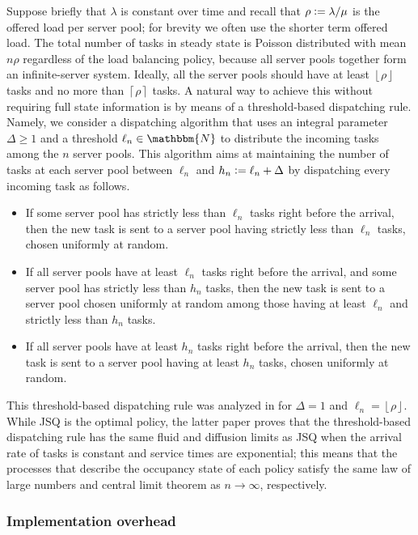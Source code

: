 \documentclass[a4paper, 12pt]{article}
\theoremstyle{definition}
\newcommand{\floor}[1]{\left\lfloor#1\right\rfloor}
\newcommand{\ceil}[1]{\left\lceil#1\right\rceil}
\newcommand{\defeq}{\vcentcolon=}
\newcommand{\N}{\mathbbm{N}}
\begin{document}
Suppose briefly that $\lambda$ is constant over time and recall that $\rho \defeq \lambda / \mu$ is the offered load per server pool; for brevity we often use the shorter term offered load. The total number of tasks in steady state is Poisson distributed with mean $n\rho$ regardless of the load balancing policy, because all server pools together form an infinite-server system. Ideally, all the server pools should have at least $\floor{\rho}$ tasks and no more than $\ceil{\rho}$ tasks. A natural way to achieve this without requiring full state information is by means of a threshold-based dispatching rule. Namely, we consider a dispatching algorithm that uses an integral parameter $\Delta \geq 1$ and a threshold $\ell_n \in \N$ to distribute the incoming tasks among the $n$ server pools. This algorithm aims at maintaining the number of tasks at each server pool between $\ell_n$ and $h_n \defeq \ell_n + \Delta$ by dispatching every incoming task as follows.
\begin{itemize}
	\item If some server pool has strictly less than $\ell_n$ tasks right before the arrival, then the new task is sent to a server pool having strictly less than $\ell_n$ tasks, chosen uniformly at random.
	
	\item If all server pools have at least $\ell_n$ tasks right before the arrival, and some server pool has strictly less than $h_n$ tasks, then the new task is sent to a server pool chosen uniformly at random among those having at least $\ell_n$ and strictly less than $h_n$ tasks.
	
	\item If all server pools have at least $h_n$ tasks right before the arrival, then the new task is sent to a server pool having at least $h_n$ tasks, chosen uniformly at random.
\end{itemize}

This threshold-based dispatching rule was analyzed in \cite{goldsztajn2021self} for $\Delta = 1$ and $\ell_n = \floor{\rho}$. While JSQ is the optimal policy, the latter paper proves that the threshold-based dispatching rule has the same fluid and diffusion limits as JSQ when the arrival rate of tasks is constant and service times are exponential; this means that the processes that describe the occupancy state of each policy satisfy the same law of large numbers and central limit theorem as $n \to \infty$, respectively.

\subsubsection{Implementation overhead}
\label{sub: implementation overheads}
\end{document}

